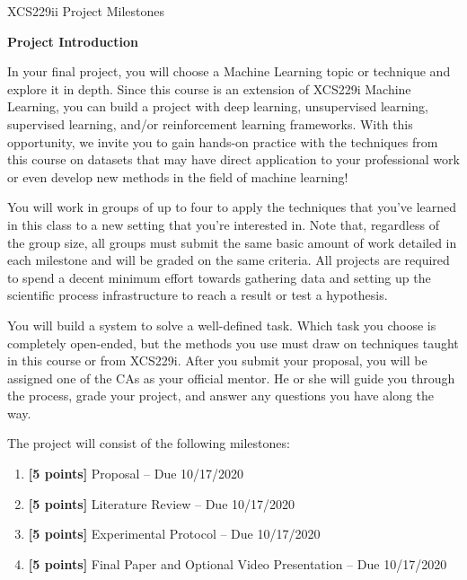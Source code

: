 



\pagestyle{myheadings} 

\huge\noindent XCS229ii Project Milestones


\large
\textbf{Project Introduction}\vspace{\baselineskip}

\normalsize
In your final project, you will choose a Machine Learning topic or technique and explore it in depth. Since this course is an extension of XCS229i Machine Learning, you can build a project with deep learning, unsupervised learning, supervised learning, and/or reinforcement learning frameworks. With this opportunity, we invite you to gain hands-on practice with the techniques from this course on datasets that may have direct application to your professional work or even develop new methods in the field of machine learning!\vspace{\baselineskip}

You will work in groups of up to four to apply the techniques that you've learned in this class to a new setting that you're interested in. Note that, regardless of the group size, all groups must submit the same basic amount of work detailed in each milestone and will be graded on the same criteria. All projects are required to spend a decent minimum effort towards gathering data and setting up the scientific process infrastructure to reach a result or test a hypothesis.\vspace{\baselineskip}

You will build a system to solve a well-defined task. Which task you choose is completely open-ended, but the methods you use must draw on techniques taught in this course or from XCS229i. After you submit your proposal, you will be assigned one of the CAs as your official mentor. He or she will guide you through the process, grade your project, and answer any questions you have along the way. \vspace{\baselineskip}

The project will consist of the following milestones:
\begin{enumerate}
    \item \textbf{[5 points]} Proposal -- Due 10/17/2020
    \item \textbf{[5 points]} Literature Review -- Due 10/17/2020 
    \item \textbf{[5 points]} Experimental Protocol -- Due 10/17/2020
    \item \textbf{[5 points]} Final Paper and Optional Video Presentation -- Due 10/17/2020
\end{enumerate}
\vspace{\baselineskip}
\vspace{\baselineskip}

